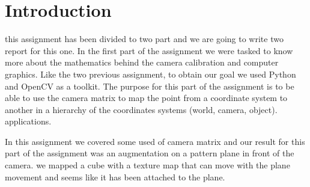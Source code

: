 \pagebreak{}
\section{Introduction}

this assignment has been divided to two part and we are going to write two report for this one. In the first part of the assignment we were tasked to know more about the mathematics behind the camera calibration and computer graphics. Like the two previous assignment, to obtain our goal we used Python and OpenCV as a toolkit. The purpose for this part of the assignment is to be able to use the camera matrix to map the point from a coordinate system to another in a hierarchy of the coordinates systems (world, camera, object). applications.

In this assignment we covered some used of camera matrix and our result for this part of the assignment was an augmentation on a pattern plane in front of the camera. we mapped a cube with a texture map that can move with the plane movement and seems like it has been attached to the plane.

